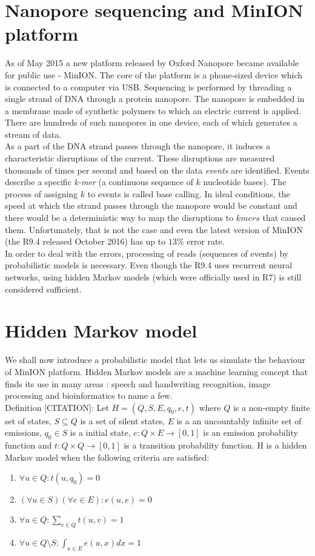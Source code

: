 \section{Nanopore sequencing and MinION platform}
As of May 2015 a new platform released by Oxford Nanopore became available for public use - MinION. The core of the platform is a phone-sized device which is connected to a computer via USB. Sequencing is performed by threading a single strand of DNA through a protein nanopore. The nanopore is embedded in a membrane made of synthetic polymers to which an electric current is applied. There are hundreds of such nanopores in one device, each of which generates a stream of data.\\
As a part of the DNA strand passes through the nanopore, it induces a characteristic disruptions of the current. These disruptions are measured thousands of times per second and based on the data \emph{events} are identified. Events describe a specific \emph{k-mer} (a continuous sequence of $k$ nucleotide bases). The process of assigning $k$ to events is called base calling. 
In ideal conditions, the speed at which the strand passes through the nanopore would be constant and there would be a deterministic way to map the disruptions to $kmers$ that caused them. Unfortunately, that is not the case and even the latest version of MinION (the R9.4 released October 2016) has up to $13\%$ error rate.\\
In order to deal with the errors, processing of reads (sequences of events) by probabilistic models is necessary. Even though the R9.4 uses recurrent neural networks, using hidden Markov models (which were officially used in R7) is still considered sufficient.

\section{Hidden Markov model}

We shall now introduce a probabilistic model that lets us simulate the behaviour of MinION platform.
Hidden Markov models are a machine learning concept that finds its use in many areas : speech and handwriting recognition, image processing and bioinformatics to name a few.\\

Definition [CITATION]: Let $H = (Q,S,E,q_0,e,t)$ where $Q$ is a non-empty finite set of states, $S \subseteq Q$ is a set of silent states, $E$ is a an uncountably infinite set of emissions, $q_0 \in S$ is a initial state, $e : Q \times E \rightarrow [0,1]$ is an emission probability function and $t : Q \times Q \rightarrow [0,1]$ is a transition probability function. H is a hidden Markov model when the following criteria are satisfied:
\begin{enumerate}
	\item{
		$\forall u \in Q : t(u, q_0) = 0$
	}
	\item{
		$(\forall u \in S)(\forall e \in E): e(u,e) = 0$
	}
	\item{
		$\forall u \in Q: \sum_{v \in Q}{t(u,v)} = 1$
	}
	\item{
		$\forall u \in Q \setminus S : \int_{x \in E}{e(u,x)dx} = 1$
	}
\end{enumerate}

